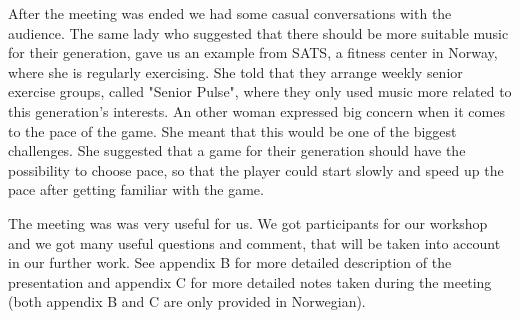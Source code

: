 After the meeting was ended we had some casual conversations with the audience. The same lady who suggested that there should be more suitable music for their generation, gave us an example from SATS, a fitness center in Norway, where she is regularly exercising. She told that they arrange weekly senior exercise groups, called "Senior Pulse", where they only used music more related to this generation's interests. An other woman expressed big concern when it comes to the pace of the game. She meant that this would be one of the biggest challenges. She suggested that a game for their generation should have the possibility to choose pace, so that the player could start slowly and speed up the pace after getting familiar with the game.

The meeting was was very useful for us. We got participants for our workshop and we got many useful questions and comment, that will be taken into account in our further work. See appendix B for more detailed description of the presentation and appendix C for more detailed notes taken during the meeting (both appendix B and C are only provided in Norwegian).
    